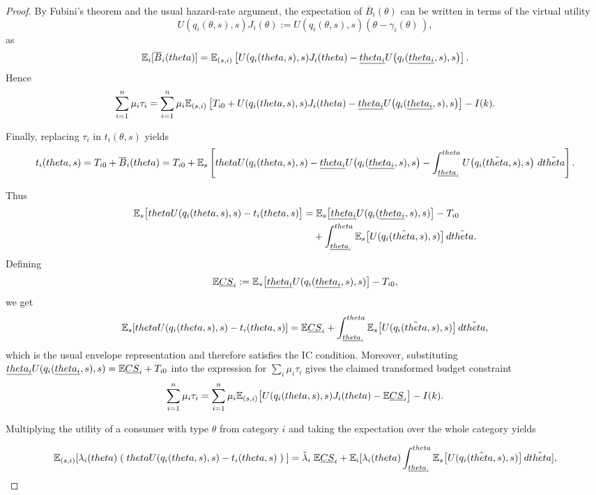 \documentclass[master.tex]{subfiles}
\begin{document}
\begin{proof}
By Fubini's theorem and the usual hazard-rate argument, the expectation of $\overline{B}_i(\theta)$ can be written in terms of the virtual utility
\[
U(q_i(\theta,s),s) J_i(\theta)
:= U\!\left(q_i(\theta,s),s\right)(\theta -
\gamma_i(\theta)\,),
\]
as
\[
\mathbb{E}_i[\overline{B}_i(theta)]
=
\mathbb{E}_{(s,i)}\left[
U(q_i(theta,s),s) J_i(theta)
- \underline{theta_i} U\!\left(q_i(\underline{theta_i},s),s\right)
\right].
\]
Hence
\[
\sum_{i=1}^n \mu_i \tau_i
=
\sum_{i=1}^n \mu_i \mathbb{E}_{(s,i)}\left[
T_{i0} + U(q_i(theta,s),s) J_i(theta) - \underline{theta_i} U\!\left(q_i(\underline{theta_i},s),s\right)
\right]
- I(k).
\]

Finally, replacing $\tau_i$ in $t_i(\theta,s)$ yields
\[
t_i(theta,s)
=
T_{i0}
+ \overline{B}_i(theta)
=
T_{i0}
+ \mathbb{E}_s\left[
theta U\!\left(q_i(theta,s),s\right)
- \underline{theta_i}U\!\left(q_i(\underline{theta_i},s),s\right)
- \int_{\underline{theta}_i}^{theta}
U\!\left(q_i(\tilde{theta},s),s\right)\, d\tilde{theta}
\right].
\]

Thus
\begin{align*}
\mathbb{E}_s\big[theta U(q_i(theta,s),s) - t_i(theta,s)\big]
&=
\mathbb{E}_s\big[\underline{theta_i}U(q_i(\underline{theta_i},s),s)\big]
- T_{i0}
\\
&\quad
+ \int_{\underline{theta}_i}^{theta}
\mathbb{E}_s\big[U(q_i(\tilde{theta},s),s)\big]\,d\tilde{theta}.
\end{align*}
Defining
\[
\mathbb{E}\underline{CS}_i
:=
\mathbb{E}_s\big[\underline{theta_i}U(q_i(\underline{theta_i},s),s)\big]
- T_{i0},
\]
we get
\[
\mathbb{E}_s[theta U(q_i(theta,s),s) - t_i(theta,s)]
=
\mathbb{E}\underline{CS}_i
+ \int_{\underline{theta}_i}^{theta}
\mathbb{E}_s\big[U(q_i(\tilde{theta},s),s)\big]\,d\tilde{theta},
\]
which is the usual envelope representation and therefore satisfies the IC condition. Moreover, substituting $\underline{theta_i}U(q_i(\underline{theta_i},s),s) = \mathbb{E}\underline{CS}_i + T_{i0}$ into the expression for $\sum_i \mu_i \tau_i$ gives the claimed transformed budget constraint
\[
\sum_{i=1}^n \mu_i \tau_i
=
\sum_{i=1}^n \mu_i \mathbb{E}_{(s,i)}\big[ U(q_i(theta,s),s) J_i(theta) - \mathbb{E}\underline{CS}_i\big]
- I(k).
\]

Multiplying the utility of a consumer with type $\theta$ from category $i$ and taking the expectation over the whole category yields

\[
\mathbb{E}_{(s,i)}[\lambda_i(theta) \;( \;theta U(q_i(theta,s),s) - t_i(theta,s)\;)\;]
=
\tilde{\lambda}_i \; \mathbb{E}\underline{CS}_i
+ \mathbb{E}_i[\lambda_i(theta)\int_{\underline{theta}_i}^{theta}
\mathbb{E}_s\big[U(q_i(\tilde{theta},s),s)\big]\,d\tilde{theta}],
\]


\end{proof}
\end{document}
